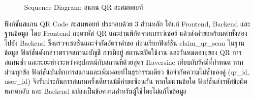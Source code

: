\begin{figure}[H]
\centering
{}
\caption{Sequence Diagram: สแกน QR สะสมพอยท์}
\label{fig:sequence_point_scan}
\end{figure}

ฟังก์ชันสแกน QR Code สะสมพอยท์ ประกอบด้วย 3 ส่วนหลัก ได้แก่ Frontend, Backend และฐานข้อมูล โดย Frontend ถอดรหัส QR และอ่านพิกัดจากเบราว์เซอร์ แล้วส่งคำขอพร้อมค่าทั้งสองไปยัง Backend ซึ่งตรวจเซสชันและจำกัดอัตราคำขอ ก่อนเรียกฟังก์ชัน claim\_qr\_scan ในฐานข้อมูล ฟังก์ชันดังกล่าวตรวจสถานะบัญชี การมีอยู่ สถานะเปิดใช้งาน และวันหมดอายุของ QR การสแกนซ้ำ และระยะห่างระหว่างอุปกรณ์กับสถานที่ด้วยสูตร Haversine เทียบกับรัศมีที่กำหนด หากผ่านทุกข้อ ฟังก์ชันบันทึกการสแกนและเพิ่มพอยท์ในธุรกรรมเดียว ข้อจำกัดความไม่ซ้ำของคู่ (qr\_id, user\_id) จึงรับประกันการสแกนครั้งเดียวแม้มีคำขอซ้อนกัน หากไม่ผ่านข้อใด ฟังก์ชันส่งรหัสข้อผิดพลาดกลับ และ Backend แปลงเป็นข้อความสำหรับผู้ใช้โดยไม่แก้ไขข้อมูล

